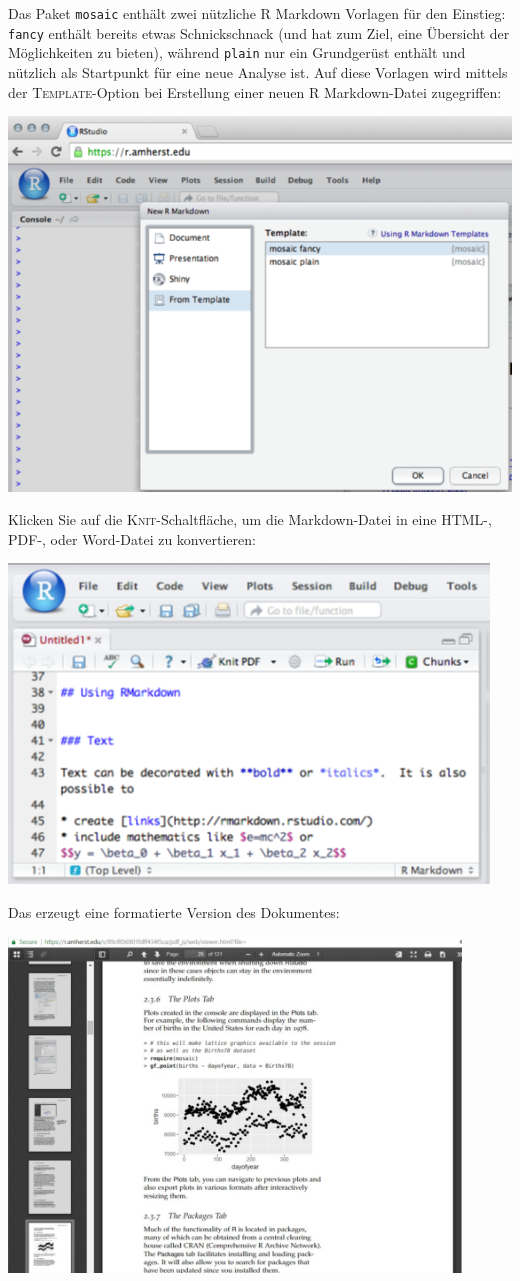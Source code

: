 \documentclass[
  ngerman,
]{scrbook}
\begin{document}
Das Paket \texttt{mosaic} enthält zwei nützliche \textsf{R Markdown} Vorlagen für den Einstieg: \texttt{fancy} enthält bereits etwas Schnickschnack (und hat zum Ziel, eine Übersicht der Möglichkeiten zu bieten), während \texttt{plain} nur ein Grundgerüst enthält und nützlich als Startpunkt für eine neue Analyse ist. Auf diese Vorlagen wird mittels der \textsc{Template}-Option bei Erstellung einer neuen \textsf{R Markdown}-Datei zugegriffen:

\begin{center}\includegraphics[width=0.5\linewidth]{images/rmarkdown2} \end{center}

Klicken Sie auf die \textsc{Knit}-Schaltfläche, um die Markdown-Datei in eine HTML-, PDF-, oder Word-Datei zu konvertieren:

\begin{center}\includegraphics[width=0.5\linewidth]{images/rmarkdown3} \end{center}

Das erzeugt eine formatierte Version des Dokumentes:

\begin{center}\includegraphics[width=0.9\textwidth]{images/rmarkdown4} \end{center}
\end{document}
